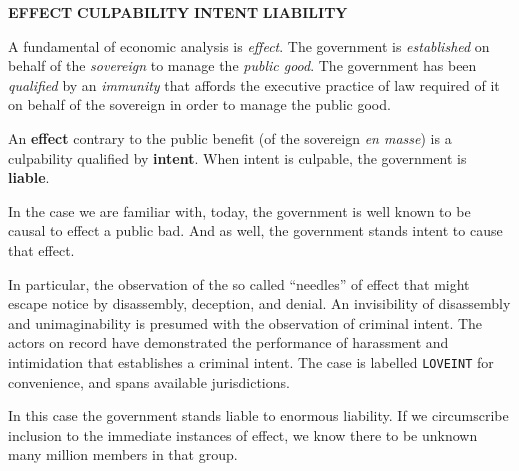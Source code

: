 


{\bf EFFECT} {\bf CULPABILITY} {\bf INTENT} {\bf LIABILITY}

A fundamental of economic analysis is {\it effect}.  The government is
{\it established} on behalf of the {\it sovereign} to manage the {\it
public good}.  The government has been {\it qualified} by an {\it
immunity} that affords the executive practice of law required of it on
behalf of the sovereign in order to manage the public good.

An {\bf effect} contrary to the public benefit (of the sovereign {\it
en masse}) is a culpability qualified by {\bf intent}.  When intent is
culpable, the government is {\bf liable}.

In the case we are familiar with, today, the government is well known
to be causal to effect a public bad.  And as well, the government
stands intent to cause that effect.

In particular, the observation of the so called ``needles'' of effect
that might escape notice by disassembly, deception, and denial.  An
invisibility of disassembly and unimaginability is presumed with the
observation of criminal intent.  The actors on record have
demonstrated the performance of harassment and intimidation that
establishes a criminal intent.  The case is labelled {\tt LOVEINT} for
convenience, and spans available jurisdictions.

In this case the government stands liable to enormous liability.  If
we circumscribe inclusion to the immediate instances of effect, we
know there to be unknown many million members in that group.

\bye
